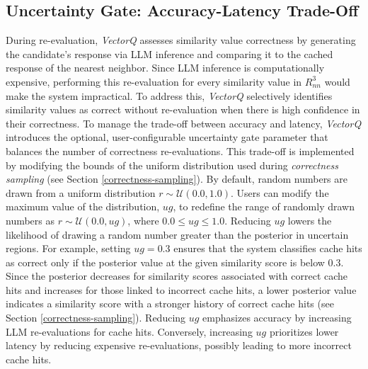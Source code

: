 \subsection{Uncertainty Gate: Accuracy-Latency Trade-Off}
\label{user-defined-parameter}
During re-evaluation, \textit{VectorQ} assesses similarity value correctness by generating the candidate's response via LLM inference and comparing it to the cached response of the nearest neighbor. Since LLM inference is computationally expensive, performing this re-evaluation for every similarity value in $R_{nn}^3$ would make the system impractical. To address this, \textit{VectorQ} selectively identifies similarity values as correct without re-evaluation when there is high confidence in their correctness.
To manage the trade-off between accuracy and latency, \textit{VectorQ} introduces the optional, user-configurable uncertainty gate parameter that balances the number of correctness re-evaluations. This trade-off is implemented by modifying the bounds of the uniform distribution used during \textit{correctness sampling} (see Section \ref{correctness-sampling}). By default, random numbers are drawn from a uniform distribution $r \sim \mathcal{U}(0.0, 1.0)$. Users can modify the maximum value of the distribution, $ug$, to redefine the range of randomly drawn numbers as $r \sim \mathcal{U}(0.0, ug)$, where $0.0 \leq ug \leq 1.0$.
Reducing $ug$ lowers the likelihood of drawing a random number greater than the posterior in uncertain regions. For example, setting $ug = 0.3$ ensures that the system classifies cache hits as correct only if the posterior value at the given similarity score is below $0.3$. Since the posterior decreases for similarity scores associated with correct cache hits and increases for those linked to incorrect cache hits, a lower posterior value indicates a similarity score with a stronger history of correct cache hits (see Section \ref{correctness-sampling}).
Reducing $ug$ emphasizes accuracy by increasing LLM re-evaluations for cache hits. Conversely, increasing $ug$ prioritizes lower latency by reducing expensive re-evaluations, possibly leading to more incorrect cache hits.


